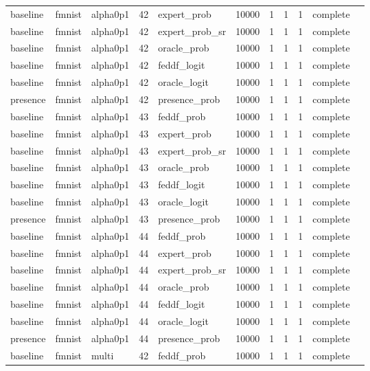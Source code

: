 \begin{tabular}{lllrlrrrrll}
baseline & fmnist & alpha0p1 & 42 & expert\_prob & 10000 & 1 & 1 & 1 & complete &  \\
baseline & fmnist & alpha0p1 & 42 & expert\_prob\_sr & 10000 & 1 & 1 & 1 & complete &  \\
baseline & fmnist & alpha0p1 & 42 & oracle\_prob & 10000 & 1 & 1 & 1 & complete &  \\
baseline & fmnist & alpha0p1 & 42 & feddf\_logit & 10000 & 1 & 1 & 1 & complete &  \\
baseline & fmnist & alpha0p1 & 42 & oracle\_logit & 10000 & 1 & 1 & 1 & complete &  \\
presence & fmnist & alpha0p1 & 42 & presence\_prob & 10000 & 1 & 1 & 1 & complete &  \\
baseline & fmnist & alpha0p1 & 43 & feddf\_prob & 10000 & 1 & 1 & 1 & complete &  \\
baseline & fmnist & alpha0p1 & 43 & expert\_prob & 10000 & 1 & 1 & 1 & complete &  \\
baseline & fmnist & alpha0p1 & 43 & expert\_prob\_sr & 10000 & 1 & 1 & 1 & complete &  \\
baseline & fmnist & alpha0p1 & 43 & oracle\_prob & 10000 & 1 & 1 & 1 & complete &  \\
baseline & fmnist & alpha0p1 & 43 & feddf\_logit & 10000 & 1 & 1 & 1 & complete &  \\
baseline & fmnist & alpha0p1 & 43 & oracle\_logit & 10000 & 1 & 1 & 1 & complete &  \\
presence & fmnist & alpha0p1 & 43 & presence\_prob & 10000 & 1 & 1 & 1 & complete &  \\
baseline & fmnist & alpha0p1 & 44 & feddf\_prob & 10000 & 1 & 1 & 1 & complete &  \\
baseline & fmnist & alpha0p1 & 44 & expert\_prob & 10000 & 1 & 1 & 1 & complete &  \\
baseline & fmnist & alpha0p1 & 44 & expert\_prob\_sr & 10000 & 1 & 1 & 1 & complete &  \\
baseline & fmnist & alpha0p1 & 44 & oracle\_prob & 10000 & 1 & 1 & 1 & complete &  \\
baseline & fmnist & alpha0p1 & 44 & feddf\_logit & 10000 & 1 & 1 & 1 & complete &  \\
baseline & fmnist & alpha0p1 & 44 & oracle\_logit & 10000 & 1 & 1 & 1 & complete &  \\
presence & fmnist & alpha0p1 & 44 & presence\_prob & 10000 & 1 & 1 & 1 & complete &  \\
baseline & fmnist & multi & 42 & feddf\_prob & 10000 & 1 & 1 & 1 & complete &  \\

\end{tabular}
